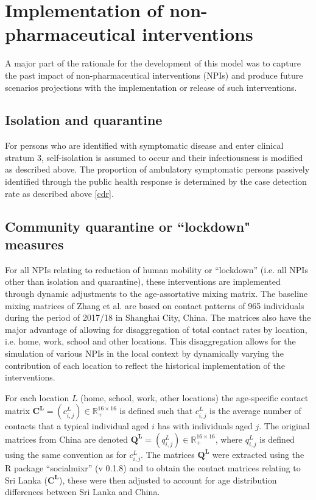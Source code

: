 \section{Implementation of non-pharmaceutical interventions} \label{npi}
A major part of the rationale for the development of this model was to capture the past impact of non-pharmaceutical interventions (NPIs) and produce future scenarios projections with the implementation or release of such interventions.

\subsection{Isolation and quarantine}
For persons who are identified with symptomatic disease and enter clinical stratum 3, self-isolation is assumed to occur and their infectiousness is modified as described above. The proportion of ambulatory symptomatic persons passively identified through the public health response is determined by the case detection rate as described above \ref{cdr}.

\subsection{Community quarantine or ``lockdown" measures}
For all NPIs relating to reduction of human mobility or “lockdown” (i.e. all NPIs other than isolation and quarantine), these interventions are implemented through dynamic adjustments to the age-assortative mixing matrix. The baseline mixing matrices of Zhang et al. \cite{RN501} are based on contact patterns of 965 individuals during the period of 2017/18 in Shanghai City, China. The matrices also have the major advantage of allowing for disaggregation of total contact rates by location, i.e. home, work, school and other locations. This disaggregation allows for the simulation of various NPIs in the local context by dynamically varying the contribution of each location to reflect the historical implementation of the interventions.

For each location $L$ (home, school, work, other locations) the age-specific contact matrix $\mathbf{C^L} = (c_{i,j}^L) \in \mathbb{R}_{+}^{16 \times 16}$ is defined such that $c_{i,j}^L$ is the average number of contacts that a typical individual aged $i$ has with individuals aged $j$. The original matrices from China are denoted $\mathbf{Q^L} = (q_{i,j}^L) \in \mathbb{R}_{+}^{16 \times 16}$, where $q_{i,j}^L$ is defined using the same convention as for $c_{i,j}^L$. The matrices $\mathbf{Q^L}$ were extracted using the R package ``socialmixr'' (v 0.1.8) and to obtain the contact matrices relating to Sri Lanka ($\mathbf{C^L}$), these were then adjusted to account for age distribution differences between Sri Lanka and China.

